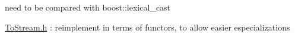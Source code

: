 
\begin{DoxyRefList}
\item[\label{todo__todo000002}%
\hypertarget{todo__todo000002}{}%
Member \hyperlink{namespace_d_d4hep_1_1_utils_a4e482234503764883507107b417e1de2}{D\+D4hep\+:\+:Utils\+:\+:to\+String} (const T\+Y\+PE \&obj)]need to be compared with boost\+::lexical\+\_\+cast  
\item[\label{todo__todo000001}%
\hypertarget{todo__todo000001}{}%
File \hyperlink{_to_stream_8h}{To\+Stream.h} ]\hyperlink{_to_stream_8h}{To\+Stream.\+h} \+: reimplement in terms of functors, to allow easier especializations 
\end{DoxyRefList}